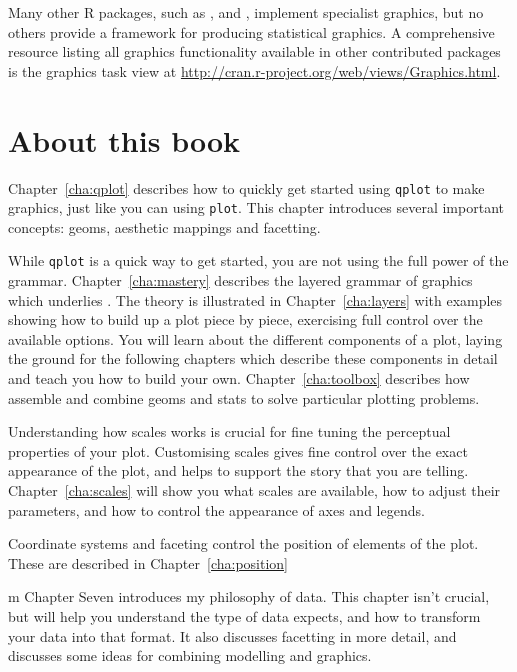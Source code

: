 Many other R packages, such as  \citep{meyer:2006},  \citep{plotrix} and  \citep{gplots}, implement specialist graphics, but no others provide a framework for producing statistical graphics.  A comprehensive resource listing all graphics functionality available in other contributed packages is the graphics task view at \url{http://cran.r-project.org/web/views/Graphics.html}.  

\section{About this book}

Chapter~\ref{cha:qplot} describes how to quickly get started using {\tt qplot} to make graphics, just like you can using {\tt plot}.  This chapter introduces several important \ggplot concepts: geoms, aesthetic mappings and facetting.
  
While {\tt qplot} is a quick way to get started, you are not using the full power of the grammar.  Chapter~\ref{cha:mastery} describes the layered grammar of graphics which underlies \ggplot.  The theory is illustrated in Chapter~\ref{cha:layers} with examples showing how to build up a plot piece by piece, exercising full control over the available options.  You will learn about the different components of a plot, laying the ground for the following chapters which describe these components in detail and teach you how to build your own.  Chapter~\ref{cha:toolbox} describes how assemble and combine geoms and stats \ggplot to solve particular plotting problems.

Understanding how scales works is crucial for fine tuning the perceptual properties of your plot.  Customising scales gives fine control over the exact appearance of the plot, and helps to support the story that you are telling.  Chapter~\ref{cha:scales} will show you what scales are available, how to adjust their parameters, and how to control the appearance of axes and legends.

Coordinate systems and faceting control the position of elements of the plot.  These are described in Chapter~\ref{cha:position}

m Chapter Seven introduces my philosophy of data.  This chapter isn't crucial, but will help you understand the type of data \ggplot expects, and how to transform your data into that format.  It also discusses facetting in more detail, and discusses some ideas for combining modelling and graphics.

